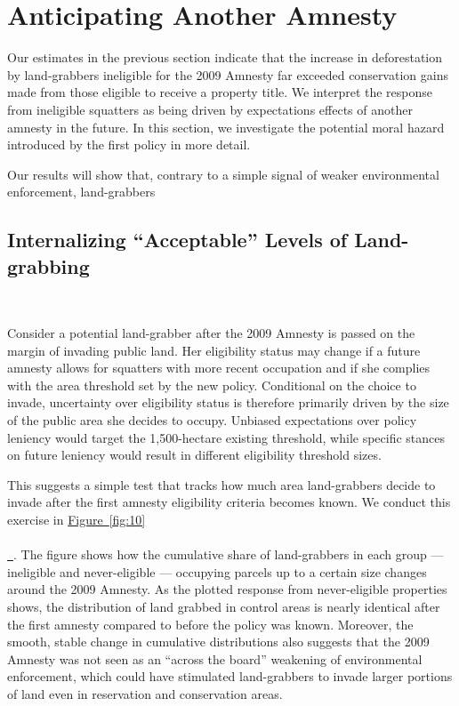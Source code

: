 \documentclass[12pt]{article}
\newcommand{\PTR}[1]{{\color{blue}{#1}}}
\newcommand*{\figref}[2][]{%
  \hyperref[{fig:#2}]{%
    Figure~\ref*{fig:#2}%
    \ifx\\#1\\%
    \else
      \,#1%
    \fi
  }%
}
\begin{document}
\section{Anticipating Another Amnesty}

Our estimates in the previous section indicate that the increase in deforestation by land-grabbers ineligible for the 2009 Amnesty far exceeded conservation gains made from those eligible to receive a property title. We interpret the response from ineligible squatters as being driven by expectations effects of another amnesty in the future. In this section, we investigate the potential moral hazard introduced by the first policy in more detail.
\ 

\quad Our results will show that, contrary to a simple signal of weaker environmental enforcement, land-grabbers \PTR{finish}

\subsection{Internalizing ``Acceptable'' Levels of Land-grabbing}
\ 

\quad Consider a potential land-grabber after the 2009 Amnesty is passed on the margin of invading public land. Her eligibility status may change if a future amnesty allows for squatters with more recent occupation and if she complies with the area threshold set by the new policy. Conditional on the choice to invade, uncertainty over eligibility status is therefore primarily driven by the size of the public area she decides to occupy. Unbiased expectations over policy leniency would target the 1,500-hectare existing threshold, while specific stances on future leniency would result in different eligibility threshold sizes. 
\ 

\quad This suggests a simple test that tracks how much area land-grabbers decide to invade after the first amnesty eligibility criteria becomes known. We conduct this exercise in \figref{10}. The figure shows how the cumulative share of land-grabbers in each group --- ineligible and never-eligible --- occupying parcels up to a certain size changes around the 2009 Amnesty. As the plotted response from never-eligible properties shows, the distribution of land grabbed in control areas is nearly identical after the first amnesty compared to before the policy was known. Moreover, the smooth, stable change in cumulative distributions also suggests that the 2009 Amnesty was not seen as an ``across the board'' weakening of environmental enforcement, which could have stimulated land-grabbers to invade larger portions of land even in reservation and conservation areas.
\ 
\end{document}
